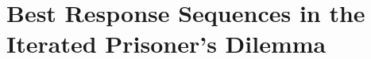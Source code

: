 \chapter{Best Response Sequences in the Iterated Prisoner's Dilemma}\label{chapter:best_response_sequence}